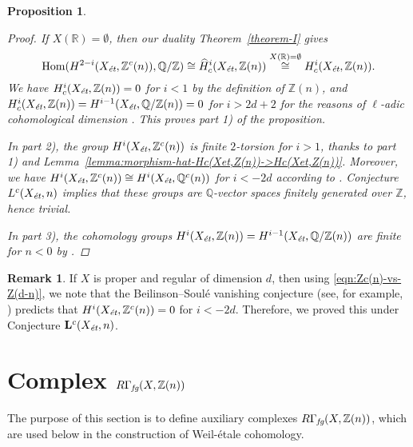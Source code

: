 \documentclass[leqno,12pt]{article}
\theoremstyle{plain}
\newtheorem{proposition}[theorem]{\indent\sc Proposition}
\theoremstyle{definition}
\newtheorem{remark}[theorem]{\indent\sc Remark}
\DeclareMathOperator{\Hom}{Hom}
\newcommand{\QQ}{\mathbb{Q}}
\newcommand{\RR}{\mathbb{R}}
\newcommand{\ZZ}{\mathbb{Z}}
\newcommand{\et}{\text{\it \'{e}t}}
\newcommand{\fg}{\text{\it fg}}
\begin{document}
\begin{proposition}
  \begin{proof}
    If $X (\RR) = \emptyset$, then our duality Theorem~\ref{theorem-I} gives
    \[ \Hom (H^{2-i} (X_\et, \ZZ^c (n)), \QQ/\ZZ) \cong
      \widehat{H}^i_c (X_\et, \ZZ (n)) \stackrel{X(\RR)=\emptyset}{\cong}
      H^i_c (X_\et, \ZZ (n)). \]
    We have $H^i_c (X_\et, \ZZ (n)) = 0$ for $i < 1$ by the definition of
    $\ZZ (n)$, and $H^i_c (X_\et, \ZZ (n)) = H^{i-1} (X_\et, \QQ/\ZZ(n)) = 0$
    for $i > 2d + 2$ for the reasons of $\ell$-adic cohomological dimension
    \cite[Expos\'{e}~X, Th\'{e}or\`{e}me~6.2]{SGA4}. This proves part 1) of the proposition.

    In part 2), the group $H^i (X_\et, \ZZ^c (n))$ is finite $2$-torsion for
    $i > 1$, thanks to part 1) and
    Lemma~\ref{lemma:morphism-hat-Hc(Xet,Z(n))->Hc(Xet,Z(n))}. Moreover, we have
    $H^i (X_\et, \ZZ^c (n)) \cong H^i (X_\et, \QQ^c (n))$ for $i < -2d$
    according to \cite[Lemma~5.12]{Morin-2014}. Conjecture $L^c (X_\et, n)$
    implies that these groups are $\QQ$-vector spaces finitely generated over
    $\ZZ$, hence trivial.

    In part 3), the cohomology groups
    $H^i (X_\et, \ZZ (n)) = H^{i-1} (X_\et, \QQ/\ZZ (n))$ are finite for $n < 0$
    by \cite[Theorem~3]{Kahn-2003}.
  \end{proof}
\end{proposition}

\begin{remark}
  If $X$ is proper and regular of dimension $d$, then using
  \eqref{eqn:Zc(n)-vs-Z(d-n)}, we note that the Beilinson--Soul\'{e} vanishing
  conjecture (see, for example, \cite[\S 4.3.4]{Kahn-2005}) predicts that
  $H^i (X_\et, \ZZ^c (n)) = 0$ for $i < -2d$. Therefore, we proved this under
  Conjecture $\mathbf{L}^c (X_\et, n)$.
\end{remark}


\section{Complex $R\Gamma_\fg (X, \ZZ(n))$}
\label{sec:RGamma-fg}

The purpose of this section is to define auxiliary complexes
$R\Gamma_\fg (X, \ZZ(n))$, which are used below in the construction of
Weil-\'{e}tale cohomology.
\end{document}
